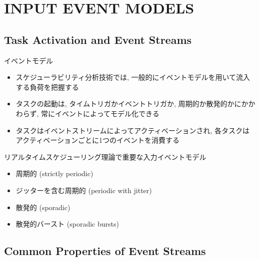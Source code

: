 
\section{INPUT EVENT MODELS}
\label{sec: input event models}

\subsection{Task Activation and Event Streams}
\label{ssec: task activation and event streams}

\begin{frame}{イベントモデル}
    \begin{itemize}
        \item スケジューラビリティ分析技術では, 一般的にイベントモデルを用いて流入する負荷を把握する
        \item タスクの起動は, タイムトリガかイベントトリガか, 周期的か散発的かにかかわらず, 常にイベントによってモデル化できる
        \item タスクはイベントストリームによってアクティベーションされ, 各タスクはアクティベーションごとに1つのイベントを消費する
    \end{itemize}
\end{frame}

\begin{frame}{リアルタイムスケジューリング理論で重要な入力イベントモデル}
    \begin{itemize}
        \item 周期的 (strictly periodic)
        \item ジッターを含む周期的 (periodic with jitter)
        \item 散発的 (sporadic)
        \item 散発的バースト (sporadic bursts)
    \end{itemize}
\end{frame}


\subsection{Common Properties of Event Streams}
\label{ssec: common properties of event streams}


